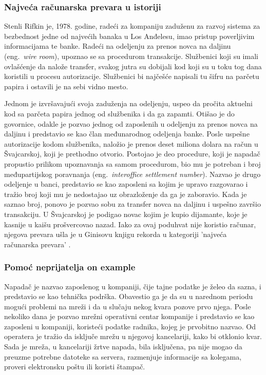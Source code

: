 \documentclass[a4paper]{article}
\begin{document}
\subsubsection{Najveća računarska prevara u istoriji}
\label{hack_za_ginisa}

Stenli Rifkin je, 1978. godine, radeći za kompaniju zaduženu za razvoj sistema za bezbednost jedne od najvećih banaka u Los Anđelesu, imao pristup poverljivim informacijama te banke. Radeći na odeljenju za prenos novca na daljinu (eng.~{\em wire room}), upoznao se sa procedurom transakcije. Službenici koji su imali ovlašćenje da nalože transfer, svakog jutra su dobijali kod koji su u toku tog dana koristili u procesu autorizacije. Službenici bi najčešće napisali tu šifru na parčetu papira i ostavili je na sebi vidno mesto. 

Jednom je izvršavajući svoja zaduženja na odeljenju, uspeo da pročita aktuelni kod sa parčeta papira jednog od službenika i da ga zapamti. Otišao je do govornice, odakle je pozvao jednog od zaposlenih u odeljenju za prenos novca na daljinu i predstavio se kao član međunarodnog odeljenja banke. Posle uspešne autorizacije kodom službenika, naložio je prenos deset miliona dolara na račun u Švajcarskoj, koji je prethodno otvorio. Postojao je deo procedure, koji je napadač propustio prilikom upoznavanja sa samom procedurom, bio mu je potreban i broj međupartijskog poravnanja (eng.~{\em interoffice settlement number}). Nazvao je drugo odeljenje u banci, predstavio se kao zaposleni sa kojim je upravo razgovarao i tražio broj koji mu je nedostajao uz obrazloženje da ga je zaboravio. Kada je saznao broj, ponovo je pozvao sobu za transfer novca na daljinu i uspešno završio transakciju. U Švajcarskoj je podigao novac kojim je kupio dijamante, koje je kasnije u kaišu prošvercovao nazad. Iako za ovaj poduhvat nije koristio računar, njegova prevara ušla je u Ginisovu knjigu rekorda u kategoriji 'najveća računarska prevara' \cite{deception}.

\subsubsection{Pomoć neprijatelja on example}
\label{pomoc_neprijatelja}
\label{network_outage}

Napadač je nazvao zaposlenog u kompaniji, čije tajne podatke je želeo da sazna, i predstavio se kao tehnička podrška. Obavestio ga je da su u narednom periodu mogući problemi na mreži i da u slučaju nekog kvara pozove prvo njega. Posle nekoliko dana je pozvao mrežni operativni centar kompanije i predstavio se kao zaposleni u kompaniji, koristeći podatke radnika, kojeg je prvobitno nazvao. Od operatera je tražio da isključe mrežu u njegovoj kancelariji, kako bi otklonio kvar. Sada je mreža, u kancelariji žrtve napada, bila isključena, pa nije mogao da preuzme potrebne datoteke sa servera, razmenjuje informacije sa kolegama, proveri elektronsku poštu ili koristi štampač.
\end{document}
